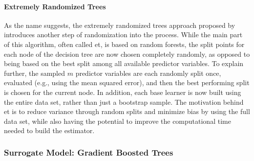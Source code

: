\paragraph{Extremely Randomized Trees}
As the name suggests, the extremely randomized trees approach proposed by \citet{geurts2006extremely} introduces another step of randomization into the process. While the main part of this algorithm, often called \gls{et}, is based on random forests, the split points for each node of the decision tree are now chosen completely randomly, as opposed to being based on the best split among all available predictor variables. To explain further, the sampled $m$ predictor variables are each randomly split once, evaluated (e.g., using the mean squared error), and then the best performing split is chosen for the current node. In addition, each base learner is now built using the entire data set, rather than just a bootstrap sample. The motivation behind \gls{et} is to reduce variance through random splits and minimize bias by using the full data set, while also having the potential to improve the computational time needed to build the estimator.

\subsubsection{Surrogate Model: Gradient Boosted Trees}

